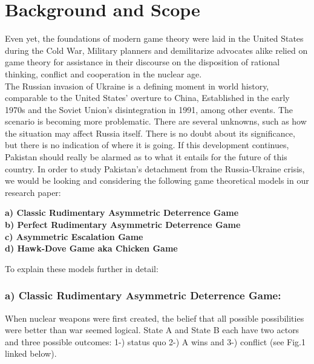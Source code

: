 \documentclass[runningheads]{llncs}
\begin{document}
\section{Background and Scope}
Even yet, the foundations of modern game theory were laid in the United States during the Cold War, Military planners and demilitarize advocates alike relied on game theory for assistance in their discourse on the disposition of rational thinking, conflict and cooperation in the nuclear age.\\
The Russian invasion of Ukraine is a defining moment in world history, comparable to the United States' overture to China, Established in the early 1970s and the Soviet Union's disintegration in 1991, among other events. The scenario is becoming more problematic. There are several unknowns, such as how the situation may affect Russia itself. There is no doubt about its significance, but there is no indication of where it is going. If this development continues, Pakistan should really be alarmed as to what it entails for the future of this country. In order to study Pakistan's detachment from the Russia-Ukraine crisis, we would be looking and considering the following game theoretical models in our research paper:
\begin{center}
    
\textbf{a) Classic Rudimentary Asymmetric Deterrence Game}\\
\textbf{b) Perfect Rudimentary Asymmetric Deterrence Game}\\
\textbf{c) Asymmetric Escalation Game}\\
\textbf{d) Hawk-Dove Game aka Chicken Game}

\end{center}

To explain these models further in detail: 
\subsubsection{a) Classic Rudimentary Asymmetric Deterrence Game:} When nuclear weapons were first created, the belief that all possible possibilities were better than war seemed logical. State A and State B each have two actors and three possible outcomes: 1-) status quo 2-) A wins and 3-) conflict (see Fig.1 linked below). \\
\end{document}
